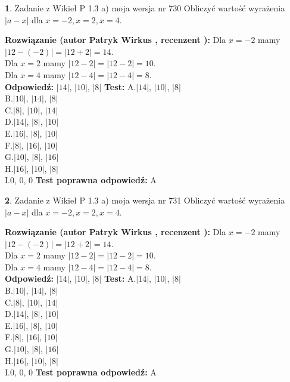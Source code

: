 \documentclass[12pt, a4paper]{article}
\theoremstyle{definition} %
\newtheorem{zad}{}
\newcommand{\zadStart}[1]{\begin{zad}#1\newline}
\newcommand{\zadStop}{\end{zad}}
\newcommand{\rozwStart}[2]{\noindent \textbf{Rozwiązanie (autor #1 , recenzent #2): }\newline}
\newcommand{\rozwStop}{\newline}
\newcommand{\odpStart}{\noindent \textbf{Odpowiedź:}\newline}
\newcommand{\odpStop}{\newline}
\newcommand{\testStart}{\noindent \textbf{Test:}\newline}
\newcommand{\testStop}{\newline}
\newcommand{\kluczStart}{\noindent \textbf{Test poprawna odpowiedź:}\newline}
\newcommand{\kluczStop}{\newline}
\begin{document}
\zadStart{Zadanie z Wikieł P 1.3 a) moja wersja nr 730}
Obliczyć wartość wyrażenia $|a - x|$ dla $x=-2,x=2,x=4$.
\zadStop
\rozwStart{Patryk Wirkus}{}
Dla $x = -2$ mamy $|12 - (-2)| = |12 + 2| = 14$.\\
Dla $x = 2$ mamy $|12 - 2| = |12 - 2| = 10$.\\
Dla $x = 4$ mamy $|12 - 4| = |12 - 4| = 8$.\\
\rozwStop
\odpStart
$|14|$, $|10|$, $|8|$
\odpStop
\testStart
A.$|14|$, $|10|$, $|8|$\\
B.$|10|$, $|14|$, $|8|$\\
C.$|8|$, $|10|$, $|14|$\\
D.$|14|$, $|8|$, $|10|$\\
E.$|16|$, $|8|$, $|10|$\\
F.$|8|$, $|16|$, $|10|$\\
G.$|10|$, $|8|$, $|16|$\\
H.$|16|$, $|10|$, $|8|$\\
I.$0$, $0$, $0$
\testStop
\kluczStart
A
\kluczStop



\zadStart{Zadanie z Wikieł P 1.3 a) moja wersja nr 731}
Obliczyć wartość wyrażenia $|a - x|$ dla $x=-2,x=2,x=4$.
\zadStop
\rozwStart{Patryk Wirkus}{}
Dla $x = -2$ mamy $|12 - (-2)| = |12 + 2| = 14$.\\
Dla $x = 2$ mamy $|12 - 2| = |12 - 2| = 10$.\\
Dla $x = 4$ mamy $|12 - 4| = |12 - 4| = 8$.\\
\rozwStop
\odpStart
$|14|$, $|10|$, $|8|$
\odpStop
\testStart
A.$|14|$, $|10|$, $|8|$\\
B.$|10|$, $|14|$, $|8|$\\
C.$|8|$, $|10|$, $|14|$\\
D.$|14|$, $|8|$, $|10|$\\
E.$|16|$, $|8|$, $|10|$\\
F.$|8|$, $|16|$, $|10|$\\
G.$|10|$, $|8|$, $|16|$\\
H.$|16|$, $|10|$, $|8|$\\
I.$0$, $0$, $0$
\testStop
\kluczStart
A
\kluczStop
\end{document}
